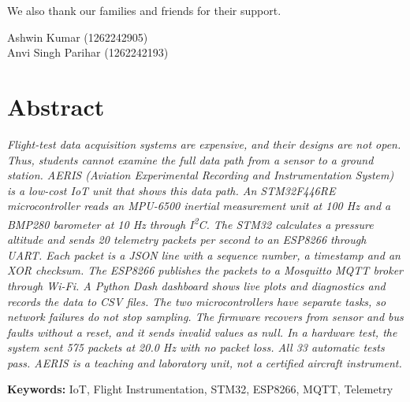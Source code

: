 \documentclass[12pt,a4paper]{report}
\newcommand{\studentnames}{Ashwin Kumar (1262242905)\\Anvi Singh Parihar (1262242193)}
\begin{document}
We also thank our families and friends for their support.

\vspace{1.5cm}
\begin{flushright}
\studentnames
\end{flushright}

\chapter*{Abstract}
\emph{Flight-test data acquisition systems are expensive, and their designs are not open. Thus, students cannot examine the full data path from a sensor to a ground station. AERIS (Aviation Experimental Recording and Instrumentation System) is a low-cost IoT unit that shows this data path. An STM32F446RE microcontroller reads an MPU-6500 inertial measurement unit at 100 Hz and a BMP280 barometer at 10 Hz through I\textsuperscript{2}C. The STM32 calculates a pressure altitude and sends 20 telemetry packets per second to an ESP8266 through UART. Each packet is a JSON line with a sequence number, a timestamp and an XOR checksum. The ESP8266 publishes the packets to a Mosquitto MQTT broker through Wi-Fi. A Python Dash dashboard shows live plots and diagnostics and records the data to CSV files. The two microcontrollers have separate tasks, so network failures do not stop sampling. The firmware recovers from sensor and bus faults without a reset, and it sends invalid values as null. In a hardware test, the system sent 575 packets at 20.0 Hz with no packet loss. All 33 automatic tests pass. AERIS is a teaching and laboratory unit, not a certified aircraft instrument.}

\vspace{0.5cm}
\noindent\textbf{Keywords:} IoT, Flight Instrumentation, STM32, ESP8266, MQTT, Telemetry

\tableofcontents
\clearpage
\listoffigures
{}
\clearpage
\listoftables
{}
\end{document}
